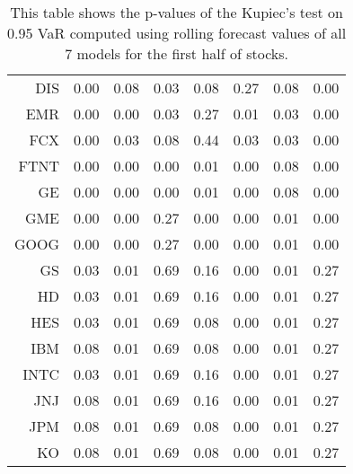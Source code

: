 \begin{table}[ht]
\begin{tabular}{rrrrrrrr}
  DIS & 0.00 & 0.08 & 0.03 & 0.08 & 0.27 & 0.08 & 0.00 \\ 
  EMR & 0.00 & 0.00 & 0.03 & 0.27 & 0.01 & 0.03 & 0.00 \\ 
  FCX & 0.00 & 0.03 & 0.08 & 0.44 & 0.03 & 0.03 & 0.00 \\ 
  FTNT & 0.00 & 0.00 & 0.00 & 0.01 & 0.00 & 0.08 & 0.00 \\ 
  GE & 0.00 & 0.00 & 0.00 & 0.01 & 0.00 & 0.08 & 0.00 \\ 
  GME & 0.00 & 0.00 & 0.27 & 0.00 & 0.00 & 0.01 & 0.00 \\ 
  GOOG & 0.00 & 0.00 & 0.27 & 0.00 & 0.00 & 0.01 & 0.00 \\ 
  GS & 0.03 & 0.01 & 0.69 & 0.16 & 0.00 & 0.01 & 0.27 \\ 
  HD & 0.03 & 0.01 & 0.69 & 0.16 & 0.00 & 0.01 & 0.27 \\ 
  HES & 0.03 & 0.01 & 0.69 & 0.08 & 0.00 & 0.01 & 0.27 \\ 
  IBM & 0.08 & 0.01 & 0.69 & 0.08 & 0.00 & 0.01 & 0.27 \\ 
  INTC & 0.03 & 0.01 & 0.69 & 0.16 & 0.00 & 0.01 & 0.27 \\ 
  JNJ & 0.08 & 0.01 & 0.69 & 0.16 & 0.00 & 0.01 & 0.27 \\ 
  JPM & 0.08 & 0.01 & 0.69 & 0.08 & 0.00 & 0.01 & 0.27 \\ 
  KO & 0.08 & 0.01 & 0.69 & 0.08 & 0.00 & 0.01 & 0.27 \\ 
   \hline
\end{tabular}
\caption[Kupiec's test p-values, alpha =0.95 (1)]{This table shows the p-values of the Kupiec's test on 0.95 VaR computed using rolling forecast values of all 7 models for the first half of stocks.} 
\label{Table:Kupiec_test_rolling_0.95_1}
\end{table}
